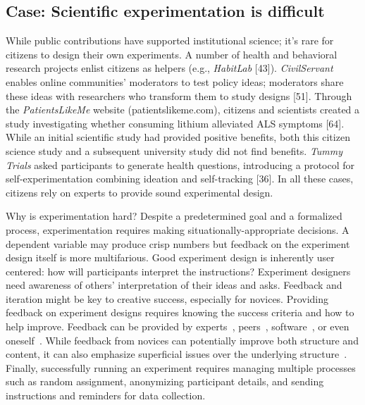 \subsection {Case: Scientific experimentation is difficult}
While public contributions have supported institutional science; it’s rare for citizens to design
their own experiments. A number of health and behavioral research projects enlist citizens as helpers (e.g., \textit{HabitLab} [43]). 
\textit{CivilServant} enables online communities’ 
moderators to test policy ideas; moderators share these ideas with researchers who transform 
them to study designs [51]. Through the \textit{PatientsLikeMe} website (patientslikeme.com), citizens 
and scientists created a study investigating whether consuming lithium alleviated ALS symptoms [64]. 
While an initial scientific study had provided positive benefits, both this citizen science study and 
a subsequent university study did not find benefits. \textit{Tummy Trials} asked 
participants to generate health questions, introducing a protocol for self-experimentation 
combining ideation and self-tracking [36]. In all these cases, citizens rely on experts to provide sound experimental design.

Why is experimentation hard?  Despite a predetermined goal and a formalized process, experimentation
requires making situationally-appropriate decisions. A dependent variable may produce crisp
numbers but feedback on the experiment design itself is more multifarious. Good experiment
design is inherently user centered: how will participants interpret the instructions? Experiment
designers need awareness of others’ interpretation of their ideas and asks. Feedback and iteration
might be key to creative success, especially for novices. Providing feedback on experiment
designs requires knowing the success criteria and how to
help improve.  Feedback can be provided by experts~\cite{dow2012shepherding, schon1984reflective}, peers~\cite{Boud1995, Kulkarni2015b}, software~\cite{Dantoni2015, Head2017}, or even oneself~\cite{Boud1995,schon1984reflective}. While feedback from novices can
potentially improve both structure and content, it can also emphasize superficial issues over the
underlying structure~\cite{chi1981expertise}. Finally, successfully running an experiment
requires managing multiple processes such as random
assignment, anonymizing participant details, and sending
instructions and reminders for data collection.


